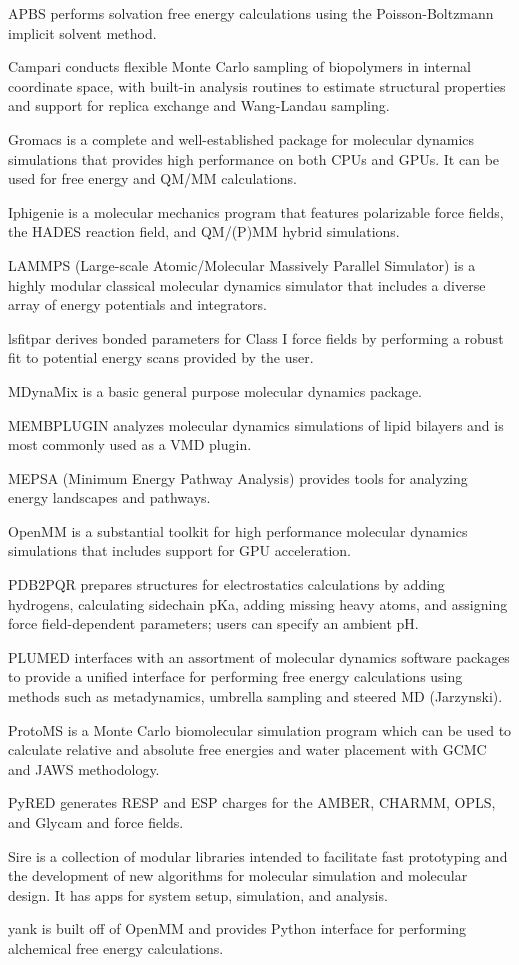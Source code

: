 APBS \cite{Baker_2001} performs solvation free energy calculations using the Poisson-Boltzmann implicit solvent method.

Campari \cite{Vitalis_2009} conducts flexible Monte Carlo sampling of biopolymers in internal coordinate space, with built-in analysis routines to estimate structural properties and support for replica exchange and Wang-Landau sampling.

Gromacs \cite{Pronk_2013} is a complete and well-established package for molecular dynamics simulations that provides high performance on both CPUs and GPUs.  It can be used for free energy and QM/MM calculations.

Iphigenie \cite{Lorenzen_2012} is a molecular mechanics program that features polarizable force fields, the HADES reaction field, and QM/(P)MM hybrid simulations.

LAMMPS  (Large-scale Atomic/Molecular Massively Parallel Simulator) \cite{Plimpton_1995} is a highly modular classical molecular dynamics simulator that includes a diverse array of energy potentials and integrators.

lsfitpar \cite{Vanommeslaeghe_2015} derives bonded parameters for Class I force fields by performing a robust fit to potential energy scans provided by the user.

MDynaMix \cite{Lyubartsev_2000} is a basic general purpose molecular dynamics package.

MEMBPLUGIN \cite{Guixa-Gonzalez_2014} analyzes molecular dynamics simulations of lipid bilayers and is most commonly used as a VMD plugin.

MEPSA (Minimum Energy Pathway Analysis) \cite{Marcos_Alcalde_2015} provides tools for analyzing energy landscapes and pathways.

OpenMM  \cite{Eastman_2013} is a substantial toolkit for high performance molecular dynamics simulations that includes support for GPU acceleration.

PDB2PQR \cite{Dolinsky_2007} prepares structures for electrostatics calculations by adding hydrogens, calculating sidechain pKa, adding missing heavy atoms, and assigning force field-dependent parameters; users can specify an ambient pH.

PLUMED \cite{Tribello_2014} interfaces with an assortment of molecular dynamics software packages to provide a unified interface for performing free energy calculations using methods such as metadynamics, umbrella sampling and steered MD (Jarzynski).

ProtoMS \cite{Michel_2006} is a Monte Carlo biomolecular simulation program which can be used to calculate relative and absolute free energies and water placement with GCMC and JAWS methodology.

PyRED \cite{Dupradeau_2010} generates RESP and ESP charges for the AMBER, CHARMM, OPLS, and Glycam and force fields.

Sire is a collection of modular libraries intended to facilitate fast prototyping and the development of new algorithms for molecular simulation and molecular design. It has apps for system setup, simulation, and analysis.

yank is built off of OpenMM and provides Python interface for performing alchemical free energy calculations.